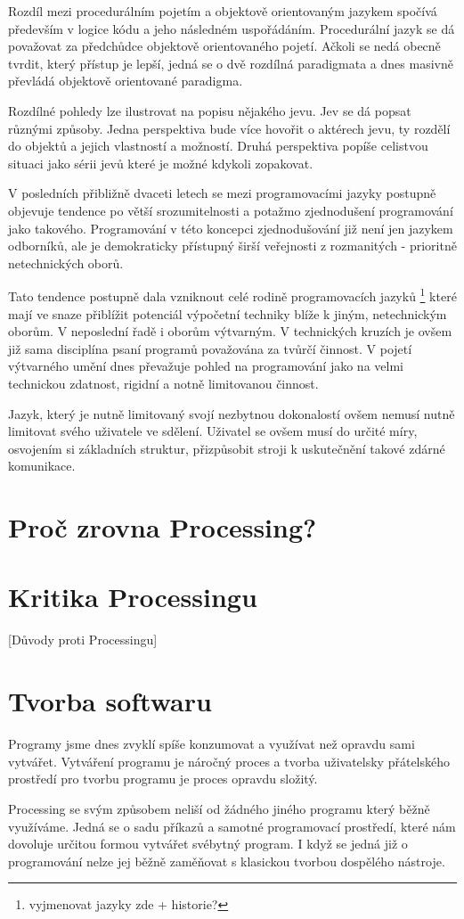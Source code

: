 \documentclass[11pt]{book}
\newcommand{\oddil}[1]{\section{#1}\label{sec:#1}}
\begin{document}
Rozdíl mezi procedurálním pojetím a objektově orientovaným jazykem spočívá především v logice kódu a jeho následném uspořádáním. Procedurální jazyk se dá považovat za předchůdce objektově orientovaného pojetí. Ačkoli se nedá obecně tvrdit, který přístup je lepší, jedná se o dvě rozdílná paradigmata a dnes masivně převládá objektově orientované paradigma.

Rozdílné pohledy lze ilustrovat na popisu nějakého jevu. Jev se dá popsat různými způsoby. Jedna perspektiva bude více hovořit o aktérech jevu, ty rozdělí do objektů a jejich vlastností a možností. Druhá perspektiva popíše celistvou situaci jako sérii jevů které je možné kdykoli zopakovat.


V posledních přibližně dvaceti letech se mezi programovacími jazyky postupně objevuje tendence po větší srozumitelnosti a potažmo zjednodušení programování jako takového. Programování v této koncepci zjednodušování již není jen jazykem odborníků, ale je demokraticky přístupný širší veřejnosti z rozmanitých - prioritně netechnických oborů.

Tato tendence postupně dala vzniknout celé rodině programovacích jazyků
\footnote{vyjmenovat jazyky zde + historie?}
které mají ve snaze přiblížit potenciál výpočetní techniky blíže k jiným, netechnickým oborům. V neposlední řadě i oborům výtvarným. V technických kruzích je ovšem již sama disciplína psaní programů považována za tvůrčí činnost. V pojetí výtvarného umění dnes převažuje pohled na programování jako na velmi technickou zdatnost, rigidní a notně limitovanou činnost.

Jazyk, který je nutně limitovaný svojí nezbytnou dokonalostí ovšem nemusí nutně limitovat svého uživatele ve sdělení. Uživatel se ovšem musí do určité míry, osvojením si základních struktur, přizpůsobit stroji k uskutečnění takové zdárné komunikace.


\oddil{Proč zrovna Processing?}

\oddil{Kritika Processingu}

[Důvody proti Processingu]

\oddil{Tvorba softwaru}

Programy jsme dnes zvyklí spíše konzumovat a využívat než opravdu sami vytvářet. Vytváření programu je náročný proces a tvorba uživatelsky přátelského prostředí pro tvorbu programu je proces opravdu složitý.

Processing se svým způsobem neliší od žádného jiného programu který běžně využíváme. Jedná se o sadu příkazů a samotné programovací prostředí, které nám dovoluje určitou formou vytvářet svébytný program. I když se jedná již o programování nelze jej běžně zaměňovat s klasickou tvorbou dospělého nástroje.
\end{document}
